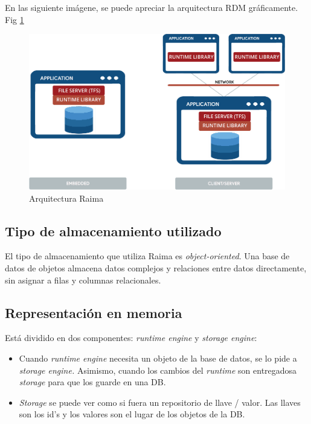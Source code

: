 \documentclass{acmart}
\begin{document}
En las siguiente imágene, se puede apreciar la arquitectura RDM gráficamente. Fig \ref{arqRaima}

\begin{figure}
	\includegraphics[width=\linewidth]{arq_1.png} %
	\caption{Arquitectura Raima} %
	\label{arqRaima} %
\end{figure}


\subsection{Tipo de almacenamiento utilizado}
El tipo de almacenamiento que utiliza Raima es \textit{object-oriented}. Una base de datos de objetos almacena datos complejos y relaciones entre datos directamente, sin asignar a filas y columnas relacionales. \cite{Rpdf1, Rarch}

\subsection{Representación en memoria}
Está dividido en dos componentes: \textit{runtime engine} y \textit{storage engine}:
\begin{itemize}
	\item Cuando \textit{runtime engine }necesita un objeto de la base de datos, se lo pide a \textit{storage engine. }Asimismo, cuando los cambios del \textit{runtime }son entregadosa \textit{storage }para que los guarde en una DB. \cite{Rinmemory}

	\item \textit{Storage }se puede ver como si fuera un repositorio de llave / valor. Las llaves son los id’s y los valores son el lugar de los objetos de la DB. \cite{Rinmemory}
\end{itemize}
\end{document}
